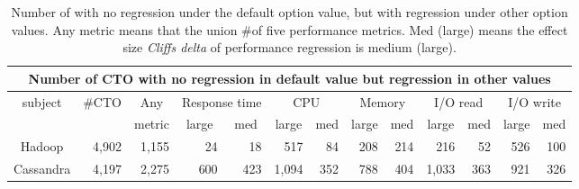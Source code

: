 \begin{table}[t]
\tabcolsep=0.08cm
\caption{Number of \instance with no regression under the default option value, but with regression under other option values. Any metric means that the union \#\instance of five performance metrics.
Med (large) means the effect size \emph{Cliff\textquotesingle s delta} of performance regression is medium (large).} %
    \begin{tabular}{|c|c|c|c|r|c|r|c|r|c|r|c|r|}
\hline
\multicolumn{13}{|c|}{Number of CTO with no regression in default value but regression   in other values}                                                                                                                                                                                                                                                            \\ \hline
\multirow{2}{*}{subject} & \multirow{2}{*}{\#CTO}     & Any                        & \multicolumn{2}{c|}{Response time}                  & \multicolumn{2}{c|}{CPU}                              & \multicolumn{2}{c|}{Memory}                         & \multicolumn{2}{c|}{I/O read}                         & \multicolumn{2}{c|}{I/O write}                      \\ \cline{4-13} 
                         &                            & metric                     & large                    & \multicolumn{1}{c|}{med} & large                      & \multicolumn{1}{c|}{med} & large                    & \multicolumn{1}{c|}{med} & large                      & \multicolumn{1}{c|}{med} & large                    & \multicolumn{1}{c|}{med} \\ \hline
Hadoop                   & \multicolumn{1}{r|}{4,902} & \multicolumn{1}{r|}{1,155} & \multicolumn{1}{r|}{24}  & 18                       & \multicolumn{1}{r|}{517}   & 84                       & \multicolumn{1}{r|}{208} & 214                      & \multicolumn{1}{r|}{216}   & 52                       & \multicolumn{1}{r|}{526} & 100                      \\ \hline
Cassandra                & \multicolumn{1}{r|}{4,197} & \multicolumn{1}{r|}{2,275} & \multicolumn{1}{r|}{600} & 423                      & \multicolumn{1}{r|}{1,094} & 352                      & \multicolumn{1}{r|}{788} & 404                      & \multicolumn{1}{r|}{1,033} & 363                      & \multicolumn{1}{r|}{921} & 326                      \\ \hline
\end{tabular}
\label{tab:option_regression}
\end{table}

